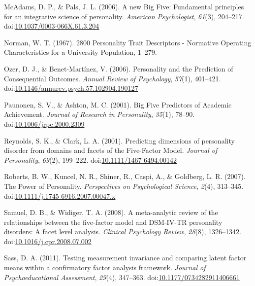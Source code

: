 \documentclass[man]{apa6}
\theoremstyle{definition}
\theoremstyle{definition}
\theoremstyle{definition}
\theoremstyle{remark}
\begin{document}
\leavevmode\hypertarget{ref-McAdams2006a}{}%
McAdams, D. P., \& Pals, J. L. (2006). A new Big Five: Fundamental
principles for an integrative science of personality. \emph{American
Psychologist}, \emph{61}(3), 204--217.
doi:\href{https://doi.org/10.1037/0003-066X.61.3.204}{10.1037/0003-066X.61.3.204}

\leavevmode\hypertarget{ref-Norman1967}{}%
Norman, W. T. (1967). 2800 Personality Trait Descriptors - Normative
Operating Characteristics for a University Population, 1--279.

\leavevmode\hypertarget{ref-OzerBenet2006}{}%
Ozer, D. J., \& Benet-Martínez, V. (2006). Personality and the
Prediction of Consequential Outcomes. \emph{Annual Review of
Psychology}, \emph{57}(1), 401--421.
doi:\href{https://doi.org/10.1146/annurev.psych.57.102904.190127}{10.1146/annurev.psych.57.102904.190127}

\leavevmode\hypertarget{ref-Paunonen2001}{}%
Paunonen, S. V., \& Ashton, M. C. (2001). Big Five Predictors of
Academic Achievement. \emph{Journal of Research in Personality},
\emph{35}(1), 78--90.
doi:\href{https://doi.org/10.1006/jrpe.2000.2309}{10.1006/jrpe.2000.2309}

\leavevmode\hypertarget{ref-ClarkReynolds2001}{}%
Reynolds, S. K., \& Clark, L. A. (2001). Predicting dimensions of
personality disorder from domains and facets of the Five-Factor Model.
\emph{Journal of Personality}, \emph{69}(2), 199--222.
doi:\href{https://doi.org/10.1111/1467-6494.00142}{10.1111/1467-6494.00142}

\leavevmode\hypertarget{ref-Roberts2007a}{}%
Roberts, B. W., Kuncel, N. R., Shiner, R., Caspi, A., \& Goldberg, L. R.
(2007). The Power of Personality. \emph{Perspectives on Psychological
Science}, \emph{2}(4), 313--345.
doi:\href{https://doi.org/10.1111/j.1745-6916.2007.00047.x}{10.1111/j.1745-6916.2007.00047.x}

\leavevmode\hypertarget{ref-SamuelWidiger2008}{}%
Samuel, D. B., \& Widiger, T. A. (2008). A meta-analytic review of the
relationships between the five-factor model and DSM-IV-TR personality
disorders: A facet level analysis. \emph{Clinical Psychology Review},
\emph{28}(8), 1326--1342.
doi:\href{https://doi.org/10.1016/j.cpr.2008.07.002}{10.1016/j.cpr.2008.07.002}

\leavevmode\hypertarget{ref-Sass2011}{}%
Sass, D. A. (2011). Testing measurement invariance and comparing latent
factor means within a confirmatory factor analysis framework.
\emph{Journal of Psychoeducational Assessment}, \emph{29}(4), 347--363.
doi:\href{https://doi.org/10.1177/0734282911406661}{10.1177/0734282911406661}
\end{document}
